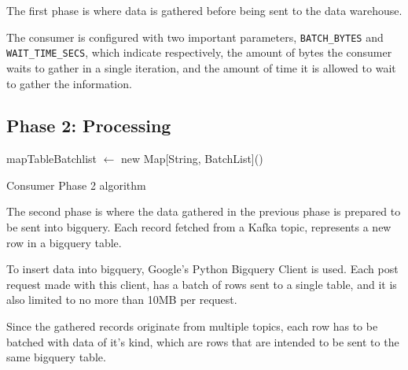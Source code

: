 The first phase is where data is gathered before being sent to the data
warehouse. 

The consumer is configured with two important parameters,
\lstinline[language=Python]{BATCH_BYTES} and
\lstinline[language=Python]{WAIT_TIME_SECS}, which indicate respectively, the
amount of bytes the consumer waits to gather in a single iteration, and the
amount of time it is allowed to wait to gather the information.

\subsection{Phase 2: Processing} \label{consumer:phase2}

\IncMargin{1em} \begin{algorithm}[h]
       \BlankLine

mapTableBatchlist $\leftarrow$ new Map[String, BatchList]()\; 
 \caption{Consumer Phase 2 algorithm}
\label{algo:phase_2} \end{algorithm}\DecMargin{1em}

The second phase is where the data gathered in the previous phase is prepared to
be sent into bigquery. Each record fetched from a Kafka topic, represents a new
row in a bigquery table. 

To insert data into bigquery, Google's Python Bigquery Client is used. Each post
request made with this client, has a batch of rows sent to a single table, and
it is also limited to no more than 10MB per request.

Since the gathered records originate from multiple topics, each row has to be
batched with data of it's kind, which are rows that are intended to be sent to
the same bigquery table.

